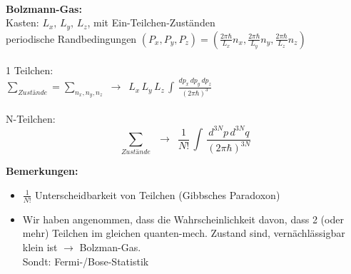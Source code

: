 \documentclass[a4paper,11pt]{scrartcl}
\begin{document}
\\
\textbf{Bolzmann-Gas:}\\
Kasten: $ L_x, \, L_y, \, L_z$, mit Ein-Teilchen-Zuständen\\
periodische Randbedingungen $ (P_x, P_y, P_z)= \left( \frac{2 \pi \hbar}{L_x}n_x, \frac{2 \pi \hbar}{L_y} n_y, \frac{2 \pi \hbar}{L_z} n_z \right) $ \\
\\
1 Teilchen:\\
$ \sum_{Zustände} = \sum_{n_x, n_y, n_z} \,\, \rightarrow \,\,\, L_x\, L_y\, L_z \, \int \, \frac{dp_x \, dp_y \, dp_z}{(2 \pi \hbar )^3}$\\
\\
N-Teilchen:
\begin{equation}
 \sum_{Zustände} \,\,\, \rightarrow \,\,\, \frac{1}{N!} \, \int \, \frac{d^{3N}p \, d^{3N}q}{(2 \pi \hbar)^{3N}}
\end{equation}

\textbf{Bemerkungen:}\\
\begin{itemize}
 \item $\frac{1}{N!}$ Unterscheidbarkeit von Teilchen (Gibbsches Paradoxon)
 \item Wir haben angenommen, dass die Wahrscheinlichkeit davon, dass 2 (oder mehr) Teilchen im gleichen quanten-mech. Zustand sind, vernächlässigbar klein ist $\rightarrow$ Bolzman-Gas. \\
 Sondt: Fermi-/Bose-Statistik
\end{itemize}
\end{document}
